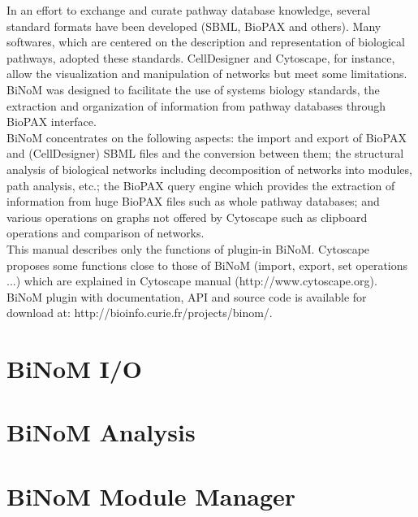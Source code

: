 \documentclass[11pt]{article}
\begin{document}
In an effort to exchange and curate pathway database knowledge, several standard
formats have been developed (SBML, BioPAX \cite{stromback2005representation} and
others). Many softwares, which are centered on the description and
representation of biological pathways, adopted these standards.
CellDesigner\cite{kitano2005using} and Cytoscape\cite{shannon2003cytoscape}, for
instance, allow the visualization and manipulation of networks but meet some
limitations. BiNoM was designed to facilitate the use of systems biology
standards, the extraction and organization of information from pathway databases
through BioPAX interface.\\

BiNoM concentrates on the following aspects: the import and export of BioPAX and
(CellDesigner) SBML files and the conversion between them; the structural
analysis of biological networks including decomposition of networks into
modules, path analysis, etc.; the BioPAX query engine which provides the
extraction of information from huge BioPAX files such as whole pathway
databases; and various operations on graphs not offered by Cytoscape such as
clipboard operations and comparison of networks.\\

This manual describes only the functions of plugin-in BiNoM. Cytoscape proposes
some functions close to those of BiNoM (import, export, set operations ...)
which are explained in Cytoscape manual (http://www.cytoscape.org).\\

BiNoM plugin with documentation, API and source code is available for download
at: http://bioinfo.curie.fr/projects/binom/.\\

\section{BiNoM I/O}

\clearpage

\section{BiNoM Analysis}

\clearpage

\section{BiNoM Module Manager}

\clearpage
\end{document}
